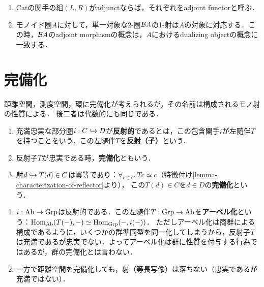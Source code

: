 \documentclass[uplatex,dvipdfmx]{jsreport}
\begin{document}
\begin{example}[adjunction]\mbox{}
    \begin{enumerate}
        \item Catの関手の組$(L,R)$がadjunctならば，それぞれをadjoint functorと呼ぶ．
        \item モノイド圏$A$に対して，単一対象な2-圏$\mathcal{B} A$の1-射は$A$の対象に対応する．この時，$\mathcal{B} A$のadjoint morphismの概念は，$A$におけるdualizing objectの概念に一致する．
    \end{enumerate}
\end{example}

\section{完備化}

\begin{tcolorbox}[colframe=ForestGreen, colback=ForestGreen!10!white,breakable,colbacktitle=ForestGreen!40!white,coltitle=black,fonttitle=\bfseries\sffamily,
title=]
    距離空間，測度空間，環に完備化が考えられるが，その名前は構成されるモノ射の性質による．
    後二者は代数的にも同じである．
\end{tcolorbox}

\begin{definition}\mbox{}
    \begin{enumerate}
        \item 充満忠実な部分圏$i:C\hookrightarrow D$が\textbf{反射的}であるとは，この包含関手$i$が左随伴$T$を持つことをいう．この左随伴$T$を\textbf{反射（子）}という．
        \item 反射子$T$が忠実である時，\textbf{完備化}ともいう．
        \item 射$d\hookrightarrow T(d)\in C$は冪等であり：$\forall_{c\in C}\;Tc\simeq c$（特徴付け\ref{lemma-characterization-of-reflector}より），
        この$T(d)\in C$を$d\in D$の\textbf{完備化}という．
    \end{enumerate}
\end{definition}
\begin{example}\mbox{}
    \begin{enumerate}
        \item $i:\mathrm{Ab}\to\mathrm{Grp}$は反射的である．この左随伴$T:\mathrm{Grp}\to\mathrm{Ab}$を\textbf{アーベル化}という：$\mathrm{Hom}_{\mathrm{Ab}}(T(-),-)\simeq\mathrm{Hom}_{\mathrm{Grp}}(-,i(-))$．
        ただしアーベル化は商群による構成であるように，いくつかの群準同型を同一化してしまうから，反射子$T$は充満であるが忠実でない．よってアーベル化は群に性質を付与する行為ではあるが，群の完備化とは言わない．
        \item 一方で距離空間を完備化しても，射（等長写像）は落ちない（忠実であるが充満ではない）．
    \end{enumerate}
\end{example}
\end{document}
